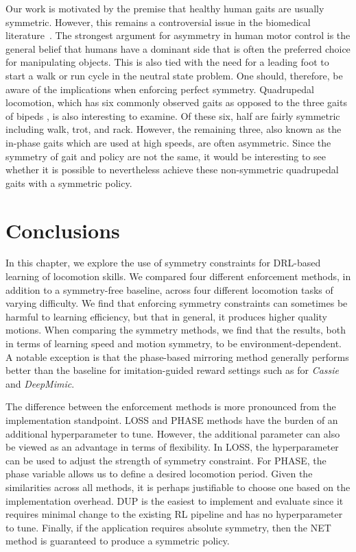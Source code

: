 
Our work is motivated by the premise that healthy human gaits are usually symmetric.  
However, this remains a controversial issue in the biomedical literature~\cite{riskowski, SADEGHI200034}.  
The strongest argument for asymmetry in human motor control is the general belief that humans have a dominant side that is often the preferred choice for manipulating objects.  This is also tied with the need for a leading foot to start a walk or run cycle in the neutral state problem.  One should, therefore, be aware of the implications when enforcing perfect symmetry.
Quadrupedal locomotion, which has six commonly observed gaits as opposed to the three gaits of bipeds \cite{locomotion_mcmahon}, is also interesting to examine.  Of these six, half are fairly symmetric including walk, trot, and rack. However, the remaining three, also known as the in-phase gaits which are used at high speeds, are often asymmetric. Since the symmetry of gait and policy are not the same, it would be interesting to see whether it is possible to nevertheless 
achieve these non-symmetric quadrupedal gaits with a symmetric policy.

\section{Conclusions}

In this chapter, we explore the use of symmetry constraints for DRL-based learning of locomotion skills.
We compared four different enforcement methods, in addition to a symmetry-free baseline, 
across four different locomotion tasks of varying difficulty.  
We find that enforcing symmetry constraints can sometimes be harmful to learning efficiency,
but that in general, it produces higher quality motions. When comparing the symmetry methods, we find that the results, both in terms of learning speed and motion symmetry, 
to be environment-dependent.  A notable exception is that the phase-based mirroring method generally 
performs better than the baseline for imitation-guided reward settings such as for \textit{Cassie} and \textit{DeepMimic}.

The difference between the enforcement methods is more pronounced from the implementation standpoint.  
LOSS and PHASE methods have the burden of an additional hyperparameter to tune. 
However, the additional parameter can also be viewed as an advantage in terms of flexibility.  
In LOSS, the hyperparameter can be used to adjust the strength of symmetry constraint.  
For PHASE, the phase variable allows us to define a desired locomotion period. 
Given the similarities across all methods, it is perhaps justifiable to choose one based on the implementation overhead.  
DUP is the easiest to implement and evaluate since it requires minimal change to the
existing RL pipeline and has no hyperparameter to tune.  
Finally, if the application requires absolute symmetry, then the NET method is guaranteed to produce a symmetric policy.

